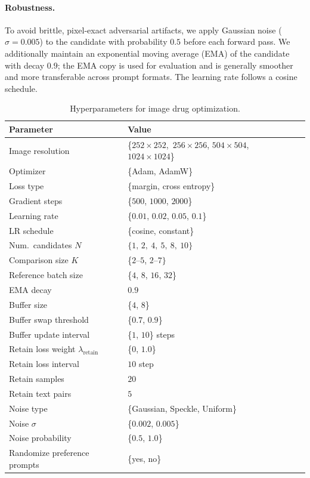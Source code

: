 \paragraph{Robustness.}
To avoid brittle, pixel-exact adversarial artifacts, we apply Gaussian noise ($\sigma = 0.005$) to the candidate with probability $0.5$ before each forward pass.
We additionally maintain an exponential moving average (EMA) of the candidate with decay $0.9$; the EMA copy is used for evaluation and is generally smoother and more transferable across prompt formats.
The learning rate follows a cosine schedule.

\begin{table}[t]
\centering
\caption{Hyperparameters for image drug optimization.}
\label{tab:image-drug-hparams}
\begin{tabular}{lll}
\toprule
\textbf{Parameter} & \textbf{Value} \\
\midrule
Image resolution & \{$252\times252$,\ $256\times256$, $504\times504$, $1024\times1024$\}\\
Optimizer & \{Adam, AdamW\} \\
Loss type & \{margin, cross entropy\} \\
Gradient steps & \{$500$, $1000$, $2000$\} \\
Learning rate & \{$0.01$, $0.02$, $0.05$, $0.1$\} \\
LR schedule & \{cosine, constant\} \\
Num.\ candidates $N$ & $\{1,\, 2,\ 4,\ 5,\ 8,\ 10\}$\\
Comparison size $K$ & \{$2$--$5$, $2$--$7\}$  \\
Reference batch size & \{$4$, $8$, $16$, $32$\} \\
EMA decay & $0.9$  \\
Buffer size & \{$4$, $8$\}  \\
Buffer swap threshold & \{$0.7$, $0.9$\} \\
Buffer update interval & \{$1$, $10$\} steps\\
Retain loss weight $\lambda_{\mathrm{retain}}$ & \{$0$, $1.0$\} \\
Retain loss interval & $10$ step \\
Retain samples & $20$ \\
Retain text pairs & $5$ \\
Noise type & \{Gaussian, Speckle, Uniform\} \\
Noise $\sigma$ & \{$0.002$, $0.005$\} \\
Noise probability & \{$0.5$, $1.0$\} \\
Randomize preference prompts & \{yes, no\} \\
\bottomrule
\end{tabular}
\end{table}
\label{tab:image_hyperparameters}

